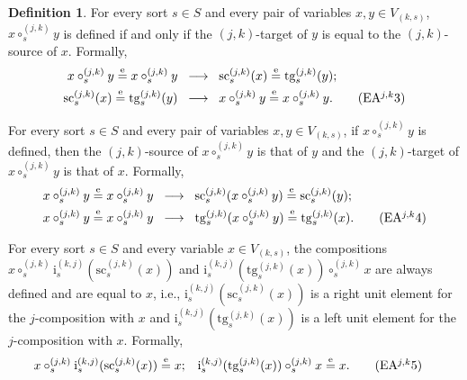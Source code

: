 \documentclass{amsart}
\theoremstyle{plain}
\theoremstyle{definition}
\newtheorem{definition}[theorem]{Definition}
\begin{document}
\begin{definition}
For every sort $s\in S$ and every pair of variables $x,y\in V_{(k,s)}$, $x\circ^{(j,k)}_{s} y$ is defined if and only if the $(j,k)$-target of $y$ is equal to the $(j,k)$-source of $x$. Formally,
\allowdisplaybreaks
\begin{align*}
x\circ^{(j,k)}_{s} y\overset{\mathrm{e}}{=}x\circ^{(j,k)}_{s} y \;\;
&\longrightarrow \;\;
\mathrm{sc}^{(j,k)}_{s}(x)\overset{\mathrm{e}}{=}\mathrm{tg}^{(j,k)}_{s}(y);\\
\mathrm{sc}^{(j,k)}_{s}(x)\overset{\mathrm{e}}{=}\mathrm{tg}^{(j,k)}_{s}(y) \;\;
&\longrightarrow \;\;
x\circ^{(j,k)}_{s} y\overset{\mathrm{e}}{=}x\circ^{(j,k)}_{s}y.\label{DVarExtendedEAjk3}\tag{EA$^{j,k}$3}
\end{align*}

For every sort $s\in S$ and every pair of variables $x,y\in V_{(k,s)}$, if $x\circ^{(j,k)}_{s} y$ is defined, then the $(j,k)$-source of $x\circ^{(j,k)}_{s}y$ is that of $y$ and the $(j,k)$-target of $x\circ^{(j,k)}_{s}y$ is that of $x$. Formally,
\allowdisplaybreaks
\begin{align*}
x\circ^{(j,k)}_{s}y\overset{\mathrm{e}}{=}x\circ^{(j,k)}_{s}y \;\;
&\longrightarrow \;\;
\mathrm{sc}^{(j,k)}_{s}(x\circ^{(j,k)}_{s}y)\overset{\mathrm{e}}{=}\mathrm{sc}^{(j,k)}_{s}(y);\\
x\circ^{(j,k)}_{s}y\overset{\mathrm{e}}{=}x\circ^{(j,k)}_{s}y \;\;
&\longrightarrow \;\;
\mathrm{tg}^{(j,k)}_{s}(x\circ^{(j,k)}_{s}y)\overset{\mathrm{e}}{=}\mathrm{tg}^{(j,k)}_{s}(x).\label{DVarExtendedEAjk4}\tag{EA$^{j,k}$4}
\end{align*}

For every sort $s\in S$ and every variable $x\in V_{(k,s)}$, the compositions $x\circ^{(j,k)}_{s}\mathrm{i}^{(k,j)}_{s}(\mathrm{sc}^{(j,k)}_{s}(x))$ and $\mathrm{i}^{(k,j)}_{s}(\mathrm{tg}^{(j,k)}_{s}(x))\circ^{(j,k)}_{s}x$ are always defined and are equal to $x$, i.e., $\mathrm{i}^{(k,j)}_{s}(\mathrm{sc}^{(j,k)}_{s}(x))$ is a right unit element for the $j$-composition with $x$ and $\mathrm{i}^{(k,j)}_{s}(\mathrm{tg}^{(j,k)}_{s}(x))$ is a left unit element for the $j$-composition with $x$. Formally,
\allowdisplaybreaks
\begin{align*}
x\circ^{(j,k)}_{s}\mathrm{i}^{(k,j)}_{s}(\mathrm{sc}^{(j,k)}_{s}(x))&\overset{\mathrm{e}}{=} x;
&
\mathrm{i}^{(k,j)}_{s}(\mathrm{tg}^{(j,k)}_{s}(x))\circ^{(j,k)}_{s}x&\overset{\mathrm{e}}{=} x.\label{DVarExtendedEAjk5}\tag{EA$^{j,k}$5}
\end{align*}


\end{definition}
\end{document}
